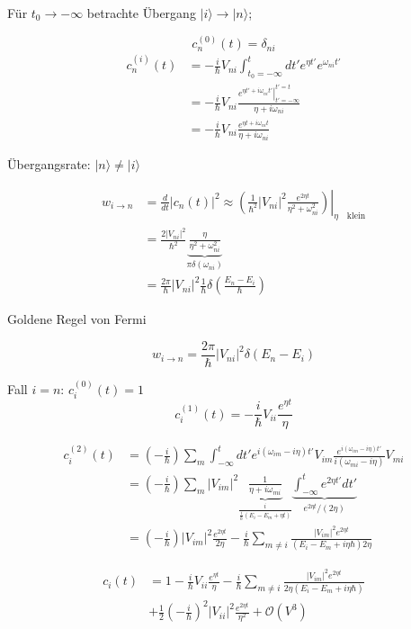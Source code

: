 Für \(t_0\rightarrow -\infty\) betrachte Übergang \(|i\rangle \rightarrow |n\rangle \);

\[c^{(0)}_n(t) = \delta_{ni}\]
\begin{align}
  c^{(i)}_n(t) &=  -\frac{i}{\hbar}V_{ni}\int_{t_0=-\infty}^t dt' e^{\eta t'}e^{\omega_{ni}t'}\\
  &= -\frac{i}{\hbar}V_{ni}\frac{\left.e^{\eta t'+i\omega_{ni}t'}\right|^{t'=t}_{t'=-\infty}}{\eta+i\omega_{ni}}\\
  &= -\frac{i}{\hbar}V_{ni}\frac{e^{\eta t+i\omega_{ni}t}}{\eta+i\omega_{ni}}
\end{align}

Übergangsrate: \(|n\rangle \neq |i\rangle \)

\begin{align}
  w_{i\rightarrow n} &= \frac{d}{dt} | c_n(t)|^2 \approx\left.\left(\frac{1}{\hbar^2}|V_{ni}|^2\frac{e^{2\eta t}}{\eta^2+\omega_{ni}^2}\right)\right|_{\eta \quad\text{klein}}\\
  &= \frac{2|V_{ni}|^2}{\hbar^2}\underbrace{\frac{\eta}{\eta^2+\omega_{ni}^2}}_{\pi\delta(\omega_{ni})}\\
  &=\frac{2\pi}{\hbar}|V_{ni}|^2 \frac{1}{\hbar}\delta\left(\frac{E_n-E_i}{\hbar}\right)
\end{align}

Goldene Regel von Fermi

\[w_{i\rightarrow n} = \frac{2\pi}{\hbar} |V_{ni}|^2 \delta(E_n-E_i)\]

Fall \(i=n\): \(c^{(0)}_i(t) = 1\)
\[c^{(1)}_i(t) = -\frac{i}{\hbar}V_{ii}\frac{e^{\eta t}}{\eta}\]

\begin{align}
  c^{(2)}_i(t) &= \left(-\frac{i}{\hbar}\right)\sum_m\int_{-\infty}^t dt'e^{i(\omega_{im}-i\eta)t'} V_{im} \frac{e^{i(\omega_{im}-i\eta)t'}}{i(\omega_{mi}-i\eta)}V_{mi} \\
  &=\left(-\frac{i}{\hbar}\right)\sum_m |V_{im}|^2\underbrace{\frac{1}{\eta+i\omega_{mi}}}_{\frac{i}{\frac{i}{\hbar}(E_i-E_m+\eta t)}}\underbrace{\int_{-\infty}^t e^{2\eta t'}dt'}_{e^{2\eta t}/(2\eta)}\\
  &= \left(-\frac{i}{\hbar}\right)|V_{im}|^2 \frac{e^{2\eta t}}{2\eta} -\frac{i}{\hbar}\sum_{m\neq i}\frac{|V_{im}|^2e^{2\eta t}}{(E_i-E_m+i\eta\hbar)2\eta}
\end{align}



\begin{align}
  c_i(t) &= 1-\frac{i}{\hbar} V_{ii}\frac{e^{\eta t}}{\eta} - \frac{i}{\hbar}\sum_{m\neq i}\frac{|V_{im}|^2e^{2\eta t}}{2\eta(E_i-E_m+i\eta\hbar)}\\
  &+\frac{1}{2}\left(-\frac{i}{\hbar}\right)^2|V_{ii}|^2 \frac{e^{2\eta t}}{\eta^2}+\mathcal O(V^3)
\end{align}



